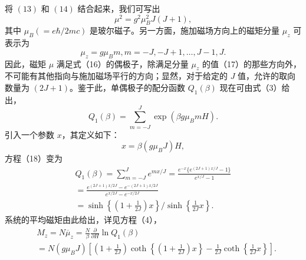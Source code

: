 将 \((13)\) 和 \((14)\) 结合起来，我们可写出
\begin{equation}\tag{3.5.96}\label{eq:3.5.96}
\mu ^{2} = g ^{2} \mu _ { B } ^{2} J ( J + 1 ) ,
\end{equation}
其中 \(\mu_{B}(=e\hbar/2mc)\) 是玻尔磁子。另一方面，施加磁场方向上的磁矩分量 \(\mu_{z}\) 可表示为
\begin{equation}\tag{3.5.97}\label{eq:3.5.97}
\mu _ { z } = g \mu _ { B } m ,  m = - J , - J + 1 , \ldots , J - 1 , J .
\end{equation}
因此，磁矩 \(\mu\) 满足式（16）的偶极子，除满足分量 \(\mu_{z}\) 的值（17）的那些方向外，不可能有其他指向与施加磁场平行的方向；显然，对于给定的 \(J\) 值，允许的取向数量为 \((2J+1)\)。鉴于此，单偶极子的配分函数 \(Q_{1}(\beta)\) 现在可由式（3）给出，
\begin{equation}\tag{3.5.98}\label{eq:3.5.98}
Q _ { 1 } ( \beta ) = \sum _ { m = - J } ^{J} \exp ( \beta g \mu _ { B } m H ) .
\end{equation}
引入一个参数 \(x\)，其定义如下：
\begin{equation}\tag{3.5.99}\label{eq:3.5.99}
x = \beta ( g \mu _ { B } J ) H ,
\end{equation}
方程（18）变为
\begin{equation}\tag{3.5.100}\label{eq:3.5.100}
\begin{array}{r} { Q _ { 1 } ( \beta ) = \displaystyle \sum _ { m = - J } ^{J} e ^{m x / J} = \frac { e ^{- x} \{ e ^{( 2 J + 1 ) x / J} - 1 \} } { e ^{x / J} - 1 } } \\{ = \frac { e ^{( 2 J + 1 ) x / 2 J} - e ^{- ( 2 J + 1 ) x / 2 J} } { e ^{x / 2 J} - e ^{- x / 2 J} } } \\{ = \sinh \left\{ \left( 1 + \frac { 1 } { 2 J } \right) x \right\} \bigg / \sinh \left\{ \frac { 1 } { 2 J } x \right\} . } \end{array}
\end{equation}
系统的平均磁矩由此给出，详见方程（4），
\begin{equation}\tag{3.5.101}\label{eq:3.5.101}
\begin{array}{rl} & { M _ { z } = N \overline { { \mu } } _ { z } = \frac { N } { \beta } \frac { \partial } { \partial H } \ln Q _ { 1 } ( \beta ) } \\& {  = N ( g \mu _ { B } J ) \left[ \left( 1 + \frac { 1 } { 2 J } \right) \coth \left\{ \left( 1 + \frac { 1 } { 2 J } \right) x \right\} - \frac { 1 } { 2 J } \coth \left\{ \frac { 1 } { 2 J } x \right\} \right] . } \end{array}
\end{equation}
